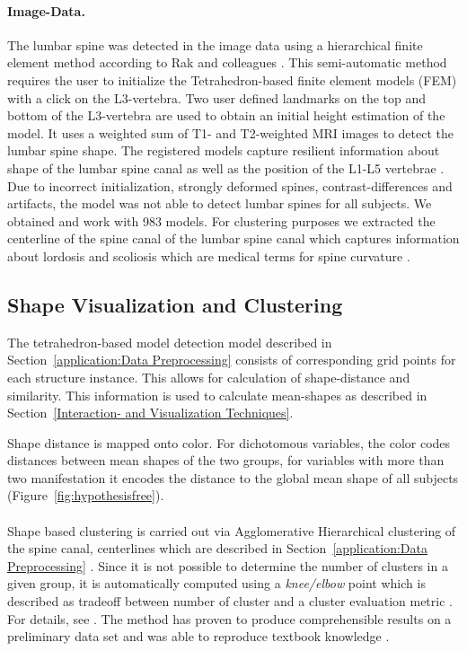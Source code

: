 \documentclass[journal]{style/vgtc} 			          %
\begin{document}
\paragraph{Image-Data.} \label{Image-Data}
The lumbar spine was detected in the image data using a hierarchical finite element method according to Rak and colleagues \cite{Rak2013}.
%
This semi-automatic method requires the user to initialize the Tetrahedron-based finite element models (FEM) with a click on the L3-vertebra.
%
Two user defined landmarks on the top and bottom of the L3-vertebra are used to obtain an initial height estimation of the model.
%
It uses a weighted sum of T1- and T2-weighted MRI images to detect the lumbar spine shape.
%
The registered models capture resilient information about shape of the lumbar spine canal as well as the position of the L1-L5 vertebrae \cite{Klemm2013VMV}.
%
Due to incorrect initialization, strongly deformed spines, contrast-differences and artifacts, the model was not able to detect lumbar spines for all subjects.
%
We obtained and work with 983 models.
%
For clustering purposes we extracted the centerline of the spine canal of the lumbar spine canal which captures information about lordosis and scoliosis which are medical terms for spine curvature \cite{Klemm2013VMV}.

\subsection{Shape Visualization and Clustering}
%
The tetrahedron-based model detection model described in Section~\ref{application:Data Preprocessing} consists of corresponding grid points for each structure instance.
%
This allows for calculation of shape-distance and similarity.
%
This information is used to calculate mean-shapes as described in Section~\ref{Interaction- and Visualization Techniques}.

Shape distance is mapped onto color.
%
For dichotomous variables, the color codes distances between mean shapes of the two groups, for variables with more than two manifestation it encodes the distance to the global mean shape of all subjects (Figure~\ref{fig:hypothesisfree}).
\\\\
Shape based clustering is carried out via Agglomerative Hierarchical clustering of the spine canal, centerlines which are described in Section~\ref{application:Data Preprocessing} \cite{Klemm2013VMV}.
%
Since it is not possible to determine the number of clusters in a given group, it is automatically computed using a \emph{knee/elbow} point which is described as tradeoff between number of cluster and a cluster evaluation metric \cite{Salvador2004}.
%
For details, see \cite{Klemm2013VMV}.
%
The method has proven to produce comprehensible results on a preliminary data set and was able to reproduce textbook knowledge \cite{Klemm2013VMV}.
\end{document}
